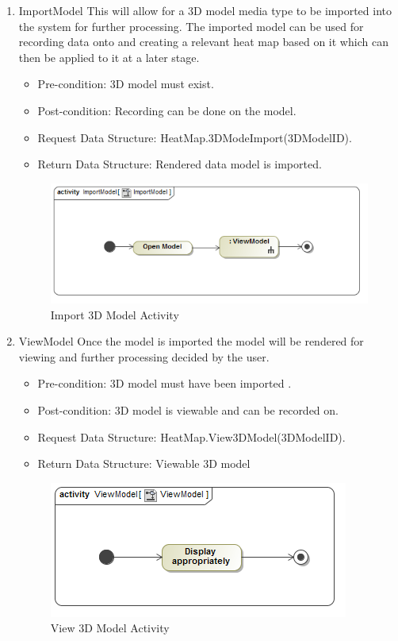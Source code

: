 	\begin{enumerate}
		\item{ImportModel}
		\newline
		This will allow for a 3D model media type to be imported into the system for further processing. The imported model can be used for recording data onto and creating a relevant heat map based on it which can then be applied to it at a later stage.
		\begin{itemize}
			\item Pre-condition: 3D model must exist.
			\item Post-condition: Recording can be done on the model.
			\item Request Data Structure: HeatMap.3DModeImport(3DModelID).
			\item Return Data Structure: Rendered data model is imported.
		\end{itemize}
		
		\begin{figure}[!ht]
			\centering
			\includegraphics[scale=0.5]{Diagrams/Activity_Diagram__ImportModel__ImportModel.png}
			\caption{Import 3D Model Activity}
		\end{figure}
	
		\item{ViewModel}
		Once the model is imported the model will be rendered for viewing and further processing decided by the user.
		\begin{itemize}
			\item Pre-condition: 3D model must have been imported .
			\item Post-condition: 3D model is viewable and can be recorded on.
			\item Request Data Structure: HeatMap.View3DModel(3DModelID).
			\item Return Data Structure: Viewable 3D model
		\end{itemize}
		\begin{figure}[!ht]
			\centering
			\includegraphics[scale=0.5]{Diagrams/Activity_Diagram__ViewModel__ViewModel.png}
		\caption{View 3D Model Activity}
		\end{figure}
		

\end{enumerate}
